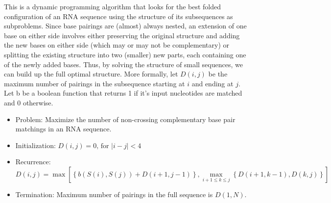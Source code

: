 \documentclass[11pt,a4paper]{article}
\begin{document}
This is a dynamic programming algorithm that looks for the best folded configuration of an RNA sequence using the structure of its subsequences as subproblems. Since base pairings are (almost) always nested, an extension of one base on either side involves either preserving the original structure and adding the new bases on either side (which may or may not be complementary) or splitting the existing structure into two (smaller) new parts, each containing one of the newly added bases. Thus, by solving the structure of small sequences, we can build up the full optimal structure. More formally, let $D(i,j)$ be the maximum number of pairings in the subsequence starting at $i$ and ending at $j$. Let b be a boolean function that returns 1 if it's input nucleotides are matched and 0 otherwise.

\begin{itemize}

\item Problem:
Maximize the number of non-crossing complementary base pair matchings in an RNA sequence. 



\iffalse %
\item Constraints:

\begin{enumerate}

\item Only complementary bases can be paired, i.e., A with U and C with G. 
\item The secondary structure consists disjoint pairs and unmatched bases. Each base can pair with at most one base.
\item The pairs in a matching must not cross, i.e., if bases in positions $i$ and $j$ are paired and if bases $k$ and $l$ are paired, then either they are nested, i.e., $i < k < l < j$ or they are non-intersecting, i.e., $i < j < k < l$. 
\item If the bases in positions i and j are paired, then $i < j - 4$.
\end{enumerate}
\fi   %



\item Initialization:
$D(i,j)=0\text{, for }|i-j|<4$

\item Recurrence:
\begin{equation}\label{recurr}
D(i,j)= \max \left[\left\lbrace b(S(i), S(j))+D(i+1,j-1)\right\rbrace, \max\limits_{i+1\leq k\leq j}\left\lbrace D(i+1, k-1), D(k,j)\right\rbrace\right]
\end{equation}

\item Termination:
Maximum number of pairings in the full sequence is $D(1,N)$.





\end{itemize}
\end{document}
